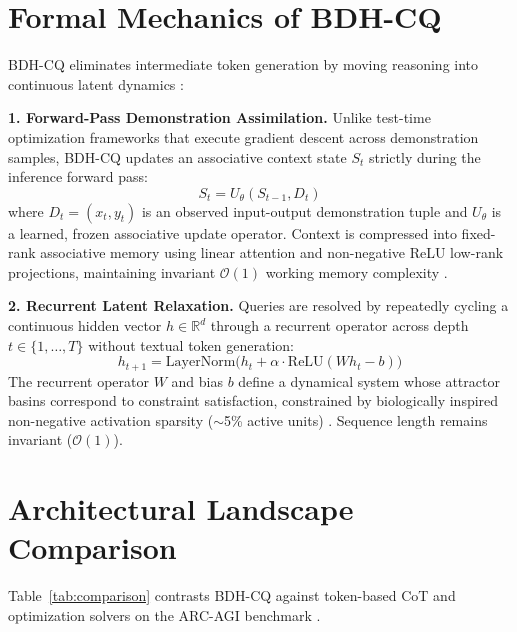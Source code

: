 \documentclass[9.5pt,a4paper]{article}
\begin{document}
\vspace{-0.45em}
\section{Formal Mechanics of BDH-CQ}
\vspace{-0.25em}
BDH-CQ eliminates intermediate token generation by moving reasoning into continuous latent dynamics \cite{bdhcq2026, pathway2025}:

\vspace{0.1em}
\noindent\textbf{1. Forward-Pass Demonstration Assimilation.} Unlike test-time optimization frameworks that execute gradient descent across demonstration samples, BDH-CQ updates an associative context state $S_t$ strictly during the inference forward pass:
\begin{equation}
    S_t = U_{\theta}(S_{t-1}, D_t)
\end{equation}
where $D_t = (x_t, y_t)$ is an observed input-output demonstration tuple and $U_\theta$ is a learned, frozen associative update operator. Context is compressed into fixed-rank associative memory using linear attention and non-negative ReLU low-rank projections, maintaining invariant $\mathcal{O}(1)$ working memory complexity \cite{bdhcq2026}.

\vspace{0.1em}
\noindent\textbf{2. Recurrent Latent Relaxation.} Queries are resolved by repeatedly cycling a continuous hidden vector $h \in \mathbb{R}^d$ through a recurrent operator across depth $t \in \{1, \dots, T\}$ without textual token generation:
\begin{equation}
    h_{t+1} = \mathrm{LayerNorm}\big(h_t + \alpha \cdot \mathrm{ReLU}(W h_t - b)\big)
\end{equation}
The recurrent operator $W$ and bias $b$ define a dynamical system whose attractor basins correspond to constraint satisfaction, constrained by biologically inspired non-negative activation sparsity ($\sim$5\% active units) \cite{pathway2025}. Sequence length remains invariant ($\mathcal{O}(1)$).

\vspace{-0.35em}
\section{Architectural Landscape Comparison}
\vspace{-0.25em}
Table~\ref{tab:comparison} contrasts BDH-CQ against token-based CoT and optimization solvers on the ARC-AGI benchmark \cite{chollet2019}.
\end{document}
